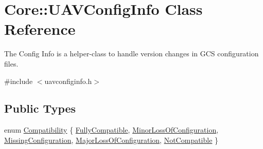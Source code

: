 \hypertarget{class_core_1_1_u_a_v_config_info}{\section{\-Core\-:\-:\-U\-A\-V\-Config\-Info \-Class \-Reference}
\label{class_core_1_1_u_a_v_config_info}
}


\-The \-Config \-Info is a helper-\/class to handle version changes in \-G\-C\-S configuration files.  




{\ttfamily \#include $<$uavconfiginfo.\-h$>$}

\subsection*{\-Public \-Types}
\begin{DoxyCompactItemize}
\item 
enum \hyperlink{group___core_plugin_ga568d6a6f7dd5f6d9b7ec976ff7c2284f}{\-Compatibility} \{ \*
\hyperlink{group___core_plugin_gga568d6a6f7dd5f6d9b7ec976ff7c2284fa85ba54a790d9dbd1745c0a4ee00b78b2}{\-Fully\-Compatible}, 
\hyperlink{group___core_plugin_gga568d6a6f7dd5f6d9b7ec976ff7c2284faf84f7dc0a0a0fa25beb58f473f081ff8}{\-Minor\-Loss\-Of\-Configuration}, 
\hyperlink{group___core_plugin_gga568d6a6f7dd5f6d9b7ec976ff7c2284fa1a847c37ce622aaa288dcd65a29131de}{\-Missing\-Configuration}, 
\hyperlink{group___core_plugin_gga568d6a6f7dd5f6d9b7ec976ff7c2284fab2dcca46e2c0d231f1ab7250bfd3dca9}{\-Major\-Loss\-Of\-Configuration}, 
\*
\hyperlink{group___core_plugin_gga568d6a6f7dd5f6d9b7ec976ff7c2284fa7174782f2d7d3709a890186f36e3480c}{\-Not\-Compatible}
 \}
\end{DoxyCompactItemize}
